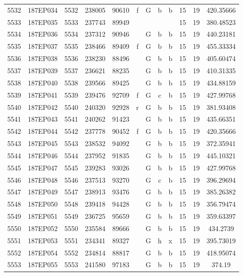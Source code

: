 \begin{tabular}{|*{12}{c|}}
5532 & 187EP034 & 5532 & 238005 & 90610 & f & G & b & b & 15 & 19 & 420.35666 \\ 
5533 & 187EP035 & 5533 & 237743 & 89949 &  &  &  &  & 15 & 19 & 380.48523 \\ 
5534 & 187EP036 & 5534 & 237312 & 90946 &  & G & b & b & 15 & 19 & 440.23181 \\ 
5535 & 187EP037 & 5535 & 238466 & 89409 & f & G & b & b & 15 & 19 & 455.33334 \\ 
5536 & 187EP038 & 5536 & 238230 & 88496 &  & G & b & b & 15 & 19 & 405.60474 \\ 
5537 & 187EP039 & 5537 & 236621 & 88235 &  & G & b & b & 15 & 19 & 410.31335 \\ 
5538 & 187EP040 & 5538 & 239566 & 89425 &  & G & b & b & 15 & 19 & 434.88159 \\ 
5539 & 187EP041 & 5539 & 239476 & 92709 & f & G & c & b & 15 & 19 & 427.99768 \\ 
5540 & 187EP042 & 5540 & 240320 & 92928 & r & G & b & b & 15 & 19 & 381.93408 \\ 
5541 & 187EP043 & 5541 & 240262 & 91423 &  & G & b & b & 15 & 19 & 435.66351 \\ 
5542 & 187EP044 & 5542 & 237778 & 90452 & f & G & b & b & 15 & 19 & 420.35666 \\ 
5543 & 187EP045 & 5543 & 238532 & 94092 &  & G & b & b & 15 & 19 & 372.35941 \\ 
5544 & 187EP046 & 5544 & 237952 & 91835 &  & G & b & b & 15 & 19 & 445.10321 \\ 
5545 & 187EP047 & 5545 & 239283 & 93026 &  & G & b & b & 15 & 19 & 427.99768 \\ 
5546 & 187EP048 & 5546 & 237513 & 93270 &  & G & c & b & 15 & 19 & 396.29694 \\ 
5547 & 187EP049 & 5547 & 238913 & 93476 &  & G & b & b & 15 & 19 & 385.26382 \\ 
5548 & 187EP050 & 5548 & 239418 & 94428 &  & G & b & b & 15 & 19 & 356.79474 \\ 
5549 & 187EP051 & 5549 & 236725 & 95659 &  & G & b & b & 15 & 19 & 359.63397 \\ 
5550 & 187EP052 & 5550 & 235584 & 89666 &  & G & b & b & 15 & 19 & 434.2739 \\ 
5551 & 187EP053 & 5551 & 234341 & 89327 &  & G & h & x & 15 & 19 & 395.73019 \\ 
5552 & 187EP054 & 5552 & 234814 & 88817 &  & G & b & b & 15 & 19 & 418.95074 \\ 
5553 & 187EP055 & 5553 & 241580 & 97183 &  & G & b & b & 15 & 19 & 374.19 \\ 

\end{tabular}
